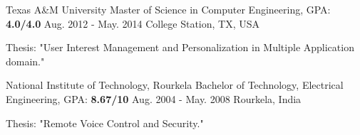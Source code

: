 

\begin{cventries}

  \cventry
    {Texas A\&M University} %
    {Master of Science in Computer Engineering, GPA: \textbf{4.0/4.0}} %
    {Aug. 2012 - May. 2014} %
    {College Station, TX, USA} %
    {
      \begin{cvitems} %
        \item {Thesis: "User Interest Management and Personalization in Multiple Application domain."}
      \end{cvitems}
    }


  \cventry
    {National Institute of Technology, Rourkela} %
    {Bachelor of Technology, Electrical Engineering,  GPA: \textbf{8.67/10}} %
    {Aug. 2004 - May. 2008} %
    {Rourkela, India} %
    {
      \begin{cvitems} %
	\item {Thesis: "Remote Voice Control and Security."}
      \end{cvitems}
    }

\end{cventries}
